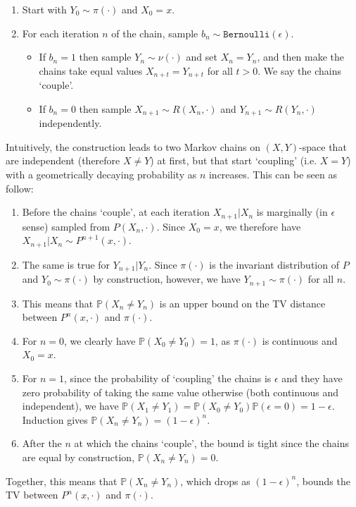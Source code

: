 \documentclass{article}
\begin{document}
\begin{enumerate}
\item Start with $Y_0 \sim \pi(\cdot)$ and $X_0 = x$.
\item For each iteration $n$ of the chain, sample $b_n \sim \texttt{Bernoulli}(\epsilon)$. 
\begin{itemize}
\item If $b_n = 1$ then sample $Y_n \sim \nu(\cdot)$ and set $X_n = Y_n$, and then make the chains take equal values $X_{n+t}=Y_{n+t}$ for all $t>0$. We say the chains  `couple'.
\item If $b_n = 0$ then sample $X_{n+1} \sim R(X_n,\cdot)$ and $Y_{n+1} \sim R(Y_{n},\cdot)$ independently.
\end{itemize}
\end{enumerate}
Intuitively, the construction leads to two Markov chains on $(X,Y)$-space that are independent (therefore $X\neq Y$) at first, but that start `coupling' (i.e. $X=Y$) with a geometrically decaying probability as $n$ increases. This can be seen as follow:
\begin{enumerate}
\item Before the chains `couple', at each iteration $X_{n+1}|X_n$ is marginally (in $\epsilon$ sense) sampled from $P(X_n,\cdot)$. Since $X_0=x$, we therefore have $X_{n+1}|X_n \sim P^{n+1}(x,\cdot)$.
\item The same is true for $Y_{n+1}|Y_n$. Since $\pi(\cdot)$ is the invariant distribution  of $P$ and $Y_0\sim\pi(\cdot)$ by construction, however, we have $Y_{n+1} \sim \pi(\cdot)$ for all $n$.
\item This means that $\mathbb{P}(X_n \neq Y_n)$ is an upper bound on the TV distance between $P^{n}(x,\cdot)$ and $\pi(\cdot)$.
\item For $n=0$, we clearly have $\mathbb{P}(X_0 \neq Y_0)=1$, as $\pi(\cdot)$ is continuous and $X_0 = x$.
\item For $n=1$, since the probability of `coupling' the chains is $\epsilon$ and they have zero probability of taking the same value otherwise (both continuous and independent), we have $\mathbb{P}(X_1 \neq Y_1)=\mathbb{P}(X_0 \neq Y_0)\mathbb{P}(\epsilon=0)=1-\epsilon$.  Induction gives $\mathbb{P}(X_n \neq Y_n) = (1-\epsilon)^n$. 
\item After the $n$ at which the chains `couple', the bound is tight since the chains are equal by construction, $\mathbb{P}(X_n \neq Y_n)=0$.
\end{enumerate}
Together, this means that $\mathbb{P}(X_n \neq Y_n)$, which drops as $(1-\epsilon)^n$, bounds the TV between $P^{n}(x,\cdot)$ and $\pi(\cdot)$. 
\end{document}
